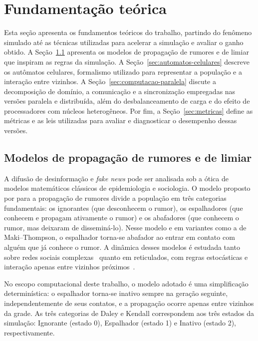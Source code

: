 
\chapter{Fundamentação teórica}\label{cap:fundamentacao}

Esta seção apresenta os fundamentos teóricos do trabalho, partindo do fenômeno simulado até as técnicas utilizadas para acelerar a simulação e avaliar o ganho obtido. A Seção~\ref{sec:modelos-rumor} apresenta os modelos de propagação de rumores e de limiar que inspiram as regras da simulação. A Seção~\ref{sec:automatos-celulares} descreve os autômatos celulares, formalismo utilizado para representar a população e a interação entre vizinhos. A Seção~\ref{sec:computacao-paralela} discute a decomposição de domínio, a comunicação e a sincronização empregadas nas versões paralela e distribuída, além do desbalanceamento de carga e do efeito de processadores com núcleos heterogêneos. Por fim, a Seção~\ref{sec:metricas} define as métricas e as leis utilizadas para avaliar e diagnosticar o desempenho dessas versões.

\section{Modelos de propagação de rumores e de limiar}\label{sec:modelos-rumor}

A difusão de desinformação e \textit{fake news} pode ser analisada sob a ótica de modelos matemáticos clássicos de epidemiologia e sociologia. O modelo proposto por  para a propagação de rumores divide a população em três categorias fundamentais: os ignorantes (que desconhecem o rumor), os espalhadores (que conhecem e propagam ativamente o rumor) e os abafadores (que conhecem o rumor, mas deixaram de disseminá-lo). Nesse modelo e em variantes como a de Maki--Thompson, o espalhador torna-se abafador ao entrar em contato com alguém que já conhece o rumor. A dinâmica desses modelos é estudada tanto sobre redes sociais complexas~\cite{Moreno2004,Nekovee2007} quanto em reticulados, com regras estocásticas e interação apenas entre vizinhos próximos~\cite{Coletti2012}.

No escopo computacional deste trabalho, o modelo adotado é uma simplificação determinística: o espalhador torna-se inativo sempre na geração seguinte, independentemente de seus contatos, e a propagação ocorre apenas entre vizinhos da grade. As três categorias de Daley e Kendall correspondem aos três estados da simulação: Ignorante (estado 0), Espalhador (estado 1) e Inativo (estado 2), respectivamente.

